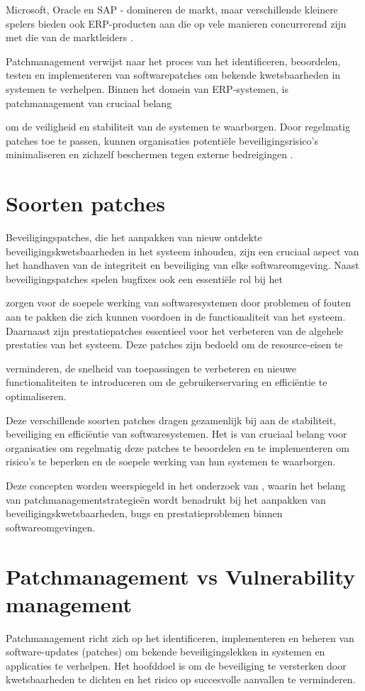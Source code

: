 Microsoft, Oracle en SAP - domineren de markt, maar verschillende kleinere spelers bieden ook ERP-producten aan die op vele manieren concurrerend zijn met die van de marktleiders \autocite{Pratt2023}.

Patchmanagement verwijst naar het proces van het identificeren, beoordelen, testen en implementeren van softwarepatches om bekende kwetsbaarheden in systemen te verhelpen. Binnen het domein van ERP-systemen, is patchmanagement van cruciaal belang

om de veiligheid en stabiliteit van de systemen te waarborgen. Door regelmatig patches toe te passen, kunnen organisaties potentiële beveiligingsrisico's minimaliseren en zichzelf beschermen tegen externe bedreigingen \autocite{Buenning2024}.

\section{Soorten patches}
Beveiligingspatches, die het aanpakken van nieuw ontdekte beveiligingskwetsbaarheden in het systeem inhouden, zijn een cruciaal aspect van het handhaven van de integriteit en beveiliging van elke softwareomgeving. Naast beveiligingspatches spelen bugfixes ook een essentiële rol bij het

zorgen voor de soepele werking van softwaresystemen door problemen of fouten aan te pakken die zich kunnen voordoen in de functionaliteit van het systeem. Daarnaast zijn prestatiepatches essentieel voor het verbeteren van de algehele prestaties van het systeem. Deze patches zijn bedoeld om de resource-eisen te 

verminderen, de snelheid van toepassingen te verbeteren en nieuwe functionaliteiten te introduceren om de gebruikerservaring en efficiëntie te optimaliseren.

Deze verschillende soorten patches dragen gezamenlijk bij aan de stabiliteit, beveiliging en efficiëntie van softwaresystemen. Het is van cruciaal belang voor organisaties om regelmatig deze patches te beoordelen en te implementeren om risico's te beperken en de soepele werking van hun systemen te waarborgen.

Deze concepten worden weerspiegeld in het onderzoek van \textcite{Wrobel2023}, waarin het belang van patchmanagementstrategieën wordt benadrukt bij het aanpakken van beveiligingskwetsbaarheden, bugs en prestatieproblemen binnen softwareomgevingen.

\section{Patchmanagement vs Vulnerability management}
Patchmanagement richt zich op het identificeren, implementeren en beheren van software-updates (patches) om bekende beveiligingslekken in systemen en applicaties te verhelpen. Het hoofddoel is om de beveiliging te versterken door kwetsbaarheden te dichten en het risico op succesvolle aanvallen te verminderen.

